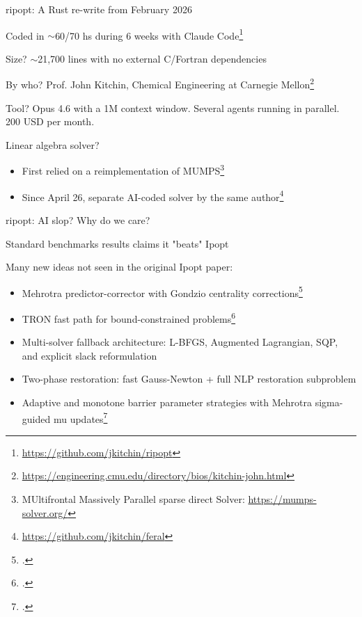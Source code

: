 \documentclass{beamer}
\begin{document}
\begin{frame}{ripopt: A Rust re-write from February 2026}

  Coded in $\sim$60/70 hs during 6 weeks with Claude Code\footnote{\tiny \url{https://github.com/jkitchin/ripopt}}

  \vfill
  Size? $\sim$21,700 lines with no external C/Fortran dependencies

  \vfill

  By who? Prof. John Kitchin, Chemical Engineering at Carnegie Mellon\footnote{\tiny \url{https://engineering.cmu.edu/directory/bios/kitchin-john.html}}

  \vfill

  Tool? Opus 4.6 with a 1M context window. Several agents running in parallel. 200 USD per month.

  \vfill

  Linear algebra solver?

  \begin{itemize}
    \item First relied on a reimplementation of MUMPS\footnote{\tiny MUltifrontal Massively Parallel sparse direct Solver: \url{https://mumps-solver.org/}}
    \item Since April 26, separate AI-coded solver by the same author\footnote{\tiny \url{https://github.com/jkitchin/feral}}

  \end{itemize}

\end{frame}

\begin{frame}{ripopt: AI slop? Why do we care?}

  Standard benchmarks results claims it "beats" Ipopt

  \vfill

  Many new ideas not seen in the original Ipopt paper:

  \begin{itemize}
    \item Mehrotra predictor-corrector with Gondzio centrality corrections\footcite{gondzio1996multiple}
    \item TRON fast path for bound-constrained problems\footcite{lin1999newton}
    \item Multi-solver fallback architecture: L-BFGS, Augmented Lagrangian, SQP, and explicit slack reformulation
    \item Two-phase restoration: fast Gauss-Newton + full NLP restoration subproblem
    \item Adaptive and monotone barrier parameter strategies with Mehrotra sigma-guided mu updates\footcite{doi:10.1137/060649513}
  \end{itemize}

\end{frame}
\end{document}

